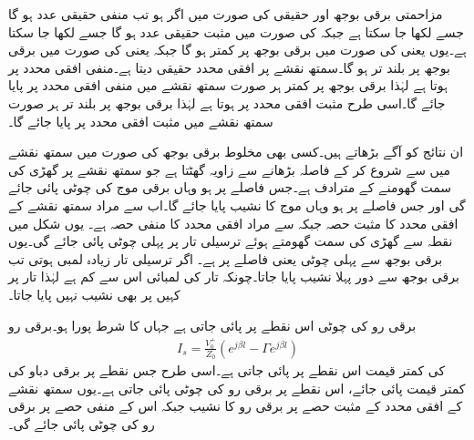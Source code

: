 مزاحمتی برقی بوجھ  اور حقیقی  کی صورت میں اگر  ہو تب  منفی حقیقی عدد ہو گا جسے   لکھا جا سکتا ہے جبکہ  کی صورت میں  مثبت حقیقی عدد ہو گا جسے   لکھا جا سکتا ہے۔یوں  یعنی  کی صورت میں برقی بوجھ پر کمتر  ہو گا جبکہ  یعنی  کی صورت میں برقی بوجھ پر بلند تر  ہو گا۔سمتھ نقشے پر افقی محدد حقیقی  دیتا ہے۔منفی افقی محدد پر   ہوتا ہے لہٰذا برقی بوجھ پر کمتر  ہر صورت سمتھ نقشے میں منفی افقی محدد پر پایا جائے گا۔اسی طرح مثبت افقی محدد پر   ہوتا ہے لہٰذا برقی بوجھ پر بلند تر  ہر صورت سمتھ نقشے میں مثبت افقی محدد پر پایا جائے گا۔

ان نتائج کو آگے بڑھاتے ہیں۔کسی بھی مخلوط برقی بوجھ  کی صورت میں سمتھ نقشے میں  سے شروع کر کے فاصلہ  بڑھانے سے زاویہ  گھٹتا ہے جو سمتھ نقشے پر گھڑی کی سمت گھومنے کے مترادف ہے۔جس فاصلے پر  ہو وہاں برقی موج کی چوٹی پائی جائے گی اور جس فاصلے پر  ہو وہاں موج کا نشیب پایا جائے گا۔اب  سے مراد سمتھ نقشے کے افقی محدد کا مثبت حصہ جبکہ
  سے مراد افقی محدد کا منفی حصہ ہے۔ یوں شکل  میں نقطہ  سے گھڑی کی سمت  گھومتے ہوئے  ترسیلی تار پر پہلی چوٹی پائی جائے گی۔یوں برقی بوجھ سے پہلی چوٹی  یعنی  فاصلے پر ہے۔ اگر ترسیلی تار زیادہ لمبی ہوتی تب برقی بوجھ سے  دور پہلا نشیب پایا جاتا۔چونکہ تار کی لمبائی اس سے کم ہے لہٰذا تار پر کہیں پر بھی نشیب نہیں پایا جاتا۔

برقی رو کی چوٹی اس نقطے پر پائی جاتی ہے جہاں  کا شرط پورا ہو۔برقی رو
\begin{align*}
I_s=\frac{V_0^+}{Z_0} \left (e^{j \beta l}-\Gamma e^{j \beta l} \right)
\end{align*}
کی کمتر قیمت اس نقطے پر پائی جاتی ہے۔اسی طرح جس نقطے پر برقی دباو کی کمتر قیمت پائی جائے، اس نقطے پر برقی رو کی چوٹی پائی جاتی ہے۔یوں سمتھ نقشے کے افقی محدد کے مثبت حصے پر برقی رو کا نشیب جبکہ اس کے منفی حصے پر برقی رو کی چوٹی پائی جائے گی۔

